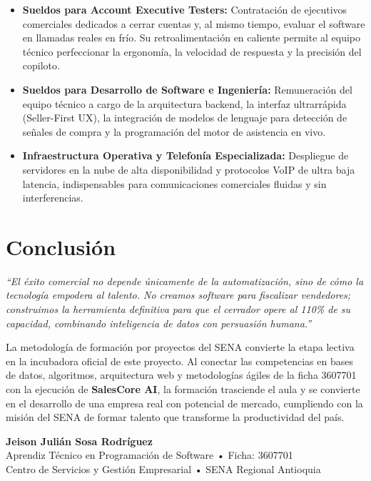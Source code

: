 \documentclass[12pt,letterpaper]{article}
\begin{document}
\begin{itemize}
    \item \textbf{Sueldos para Account Executive Testers:} Contratación de ejecutivos comerciales dedicados a cerrar cuentas y, al mismo tiempo, evaluar el software en llamadas reales en frío. Su retroalimentación en caliente permite al equipo técnico perfeccionar la ergonomía, la velocidad de respuesta y la precisión del copiloto.
    \item \textbf{Sueldos para Desarrollo de Software e Ingeniería:} Remuneración del equipo técnico a cargo de la arquitectura backend, la interfaz ultrarrápida (Seller-First UX), la integración de modelos de lenguaje para detección de señales de compra y la programación del motor de asistencia en vivo.
    \item \textbf{Infraestructura Operativa y Telefonía Especializada:} Despliegue de servidores en la nube de alta disponibilidad y protocolos VoIP de ultra baja latencia, indispensables para comunicaciones comerciales fluidas y sin interferencias.
\end{itemize}

\section{Conclusión}

\vspace{0.2cm}
\begin{center}
\parbox{0.92\textwidth}{
    \centering\itshape\color{titlecolor}
    ``El éxito comercial no depende únicamente de la automatización, sino de cómo la tecnología empodera al talento. No creamos software para fiscalizar vendedores; construimos la herramienta definitiva para que el cerrador opere al 110\% de su capacidad, combinando inteligencia de datos con persuasión humana.''
}
\end{center}
\vspace{0.2cm}

La metodología de formación por proyectos del SENA convierte la etapa lectiva en la incubadora oficial de este proyecto. Al conectar las competencias en bases de datos, algoritmos, arquitectura web y metodologías ágiles de la ficha 3607701 con la ejecución de \textbf{SalesCore AI}, la formación trasciende el aula y se convierte en el desarrollo de una empresa real con potencial de mercado, cumpliendo con la misión del SENA de formar talento que transforme la productividad del país.

\vspace{0.6cm}
\begin{flushright}
    \textbf{Jeison Julián Sosa Rodríguez}\\
    Aprendiz Técnico en Programación de Software • Ficha: 3607701\\
    Centro de Servicios y Gestión Empresarial • SENA Regional Antioquia
\end{flushright}
\end{document}
